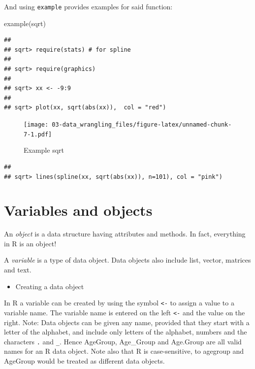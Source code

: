 \documentclass[
]{book}
\newenvironment{Shaded}{\begin{snugshade}}{\end{snugshade}}
\newcommand{\FunctionTok}[1]{\textcolor[rgb]{0.00,0.00,0.00}{#1}}
\newcommand{\NormalTok}[1]{#1}
\providecommand{\tightlist}{%
  \setlength{\itemsep}{0pt}\setlength{\parskip}{0pt}}
\begin{document}
And using \texttt{example} provides examples for said function:

\begin{Shaded}
\begin{Highlighting}[]
\FunctionTok{example}\NormalTok{(sqrt)}
\end{Highlighting}
\end{Shaded}

\begin{verbatim}
## 
## sqrt> require(stats) # for spline
## 
## sqrt> require(graphics)
## 
## sqrt> xx <- -9:9
## 
## sqrt> plot(xx, sqrt(abs(xx)),  col = "red")
\end{verbatim}

\begin{figure}
\centering
\texttt{[image: 03-data\_wrangling\_files/figure-latex/unnamed-chunk-7-1.pdf]}
\caption{\label{fig:unnamed-chunk-7}Example sqrt}
\end{figure}

\begin{verbatim}
## 
## sqrt> lines(spline(xx, sqrt(abs(xx)), n=101), col = "pink")
\end{verbatim}

\hypertarget{variables-and-objects}{%
\section{Variables and objects}\label{variables-and-objects}}

An \emph{object} is a data structure having attributes and methods. In fact, everything in R is an object!

A \emph{variable} is a type of data object. Data objects also include list, vector, matrices and text.

\begin{itemize}
\tightlist
\item
  Creating a data object
\end{itemize}

In R a variable can be created by using the symbol \texttt{\textless{}-} to assign a value to a variable name. The variable name is entered on the left \texttt{\textless{}-} and the value on the right. Note: Data objects can be given any name, provided that they start with a letter of the alphabet, and include only letters of the alphabet, numbers and the characters \texttt{.} and \texttt{\_}. Hence AgeGroup, Age\_Group and Age.Group are all valid names for an R data object. Note also that R is case-sensitive, to agegroup and AgeGroup would be treated as different data objects.
\end{document}
